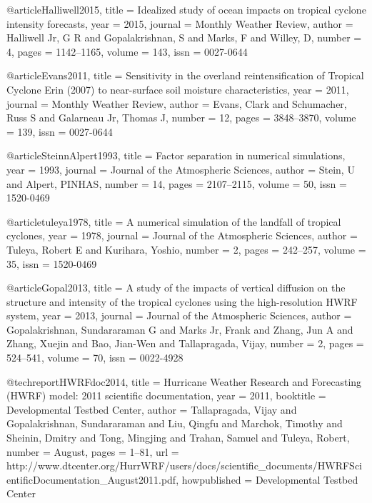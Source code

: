 \documentclass[fleqn,10pt]{wlscirep}
\begin{document}
{@article{Halliwell2015,
    title = {{Idealized study of ocean impacts on tropical cyclone intensity forecasts}},
    year = {2015},
    journal = {Monthly Weather Review},
    author = {Halliwell Jr, G R and Gopalakrishnan, S and Marks, F and Willey, D},
    number = {4},
    pages = {1142--1165},
    volume = {143},
    issn = {0027-0644}
}

@article{Evans2011,
    title = {{Sensitivity in the overland reintensification of Tropical Cyclone Erin (2007) to near-surface soil moisture characteristics}},
    year = {2011},
    journal = {Monthly Weather Review},
    author = {Evans, Clark and Schumacher, Russ S and Galarneau Jr, Thomas J},
    number = {12},
    pages = {3848--3870},
    volume = {139},
    issn = {0027-0644}
}

@article{SteinnAlpert1993,
    title = {{Factor separation in numerical simulations}},
    year = {1993},
    journal = {Journal of the Atmospheric Sciences},
    author = {Stein, U and Alpert, PINHAS},
    number = {14},
    pages = {2107--2115},
    volume = {50},
    issn = {1520-0469}
}

@article{tuleya1978,
    title = {{A numerical simulation of the landfall of tropical cyclones}},
    year = {1978},
    journal = {Journal of the Atmospheric Sciences},
    author = {Tuleya, Robert E and Kurihara, Yoshio},
    number = {2},
    pages = {242--257},
    volume = {35},
    issn = {1520-0469}
}

@article{Gopal2013,
    title = {{A study of the impacts of vertical diffusion on the structure and intensity of the tropical cyclones using the high-resolution HWRF system}},
    year = {2013},
    journal = {Journal of the Atmospheric Sciences},
    author = {Gopalakrishnan, Sundararaman G and Marks Jr, Frank and Zhang, Jun A and Zhang, Xuejin and Bao, Jian-Wen and Tallapragada, Vijay},
    number = {2},
    pages = {524--541},
    volume = {70},
    issn = {0022-4928}
}

@techreport{HWRFdoc2014,
    title = {{Hurricane Weather Research and Forecasting (HWRF) model: 2011 scientific documentation}},
    year = {2011},
    booktitle = {Developmental Testbed Center},
    author = {Tallapragada, Vijay and Gopalakrishnan, Sundararaman and Liu, Qingfu and Marchok, Timothy and Sheinin, Dmitry and Tong, Mingjing and Trahan, Samuel and Tuleya, Robert},
    number = {August},
    pages = {1--81},
    url = {http://www.dtcenter.org/HurrWRF/users/docs/scientific{\_}documents/HWRFScientificDocumentation{\_}August2011.pdf},
    howpublished = {Developmental Testbed Center}
}

}
\end{document}

